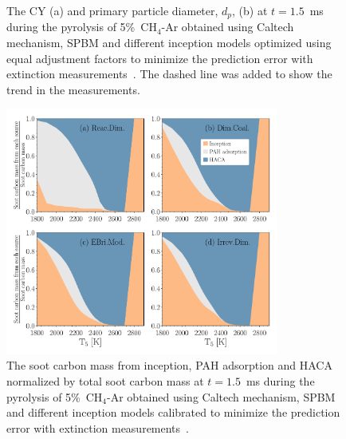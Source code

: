 \begin{figure}[H]
	\centering
	\caption{The CY (a) and primary particle diameter, $d_p$, (b) at $t=1.5$~ms during the pyrolysis of 5\%~$\mathrm{CH_4}$-Ar obtained using Caltech mechanism, SPBM and different inception models optimized using equal adjustment factors to minimize the prediction error with extinction measurements~\citep{agafonov2016unified}. The dashed line was added to show the trend in the measurements.}
	\label{fig:shockagof_yield_dp_cpr} 
\end{figure}


\begin{figure}[H]
	\centering
	\includegraphics[width=0.8\textwidth]{Figures/Results/Shocktube/Agafonov2016_cpr/C_tot_distmap_5CH4.pdf}
	\caption{The soot carbon mass from inception, PAH adsorption and HACA normalized by total soot carbon mass at $t=1.5$~ms during the pyrolysis of 5\%~$\mathrm{CH_4}$-Ar obtained using Caltech mechanism, SPBM and different inception models calibrated to minimize the prediction error with extinction measurements~\citep{agafonov2016unified}.}
	\label{fig:shockagof_carbon_map_cpr} 
\end{figure}


